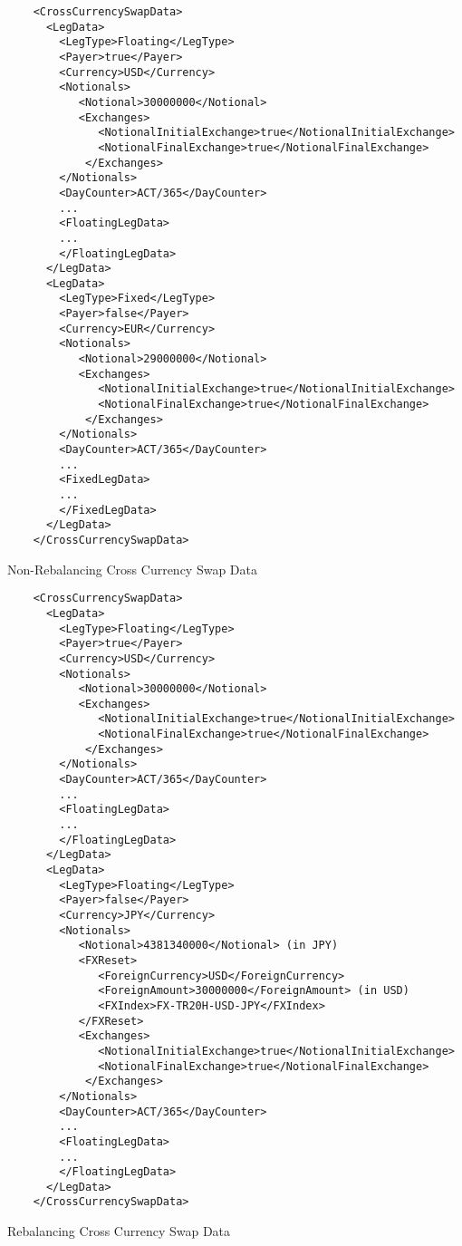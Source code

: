 {\begin{listing}[H]
\begin{verbatim}
    <CrossCurrencySwapData>
      <LegData>
        <LegType>Floating</LegType>
        <Payer>true</Payer>
        <Currency>USD</Currency>
        <Notionals>
           <Notional>30000000</Notional>
           <Exchanges>
              <NotionalInitialExchange>true</NotionalInitialExchange>
              <NotionalFinalExchange>true</NotionalFinalExchange>
            </Exchanges>
        </Notionals>
        <DayCounter>ACT/365</DayCounter>
        ...
        <FloatingLegData>
        ...
        </FloatingLegData>
      </LegData>
      <LegData>
        <LegType>Fixed</LegType>
        <Payer>false</Payer>
        <Currency>EUR</Currency>
        <Notionals>
           <Notional>29000000</Notional>
           <Exchanges>
              <NotionalInitialExchange>true</NotionalInitialExchange>
              <NotionalFinalExchange>true</NotionalFinalExchange>
            </Exchanges>
        </Notionals>        
        <DayCounter>ACT/365</DayCounter>
        ...
        <FixedLegData>
        ...
        </FixedLegData>
      </LegData>
    </CrossCurrencySwapData>
\end{verbatim}
\caption{Non-Rebalancing Cross Currency Swap Data}
\label{lst:crosscurrencyswapnonreset}
\end{listing}

\begin{listing}[H]
\begin{verbatim}
    <CrossCurrencySwapData>
      <LegData>
        <LegType>Floating</LegType>
        <Payer>true</Payer>
        <Currency>USD</Currency>
        <Notionals>
           <Notional>30000000</Notional>
           <Exchanges>
              <NotionalInitialExchange>true</NotionalInitialExchange>
              <NotionalFinalExchange>true</NotionalFinalExchange>
            </Exchanges>
        </Notionals>
        <DayCounter>ACT/365</DayCounter>
        ...
        <FloatingLegData>
        ...
        </FloatingLegData>
      </LegData>
      <LegData>
        <LegType>Floating</LegType>
        <Payer>false</Payer>
        <Currency>JPY</Currency>
        <Notionals>
           <Notional>4381340000</Notional> (in JPY)
           <FXReset>
              <ForeignCurrency>USD</ForeignCurrency>
              <ForeignAmount>30000000</ForeignAmount> (in USD)
              <FXIndex>FX-TR20H-USD-JPY</FXIndex>
           </FXReset>
           <Exchanges>
              <NotionalInitialExchange>true</NotionalInitialExchange>
              <NotionalFinalExchange>true</NotionalFinalExchange>
            </Exchanges>
        </Notionals> 
        <DayCounter>ACT/365</DayCounter>
        ...
        <FloatingLegData>
        ...
        </FloatingLegData>
      </LegData>
    </CrossCurrencySwapData>
\end{verbatim}
\caption{Rebalancing Cross Currency Swap Data}
\label{lst:crosscurrencyswapreset}
\end{listing}

}

